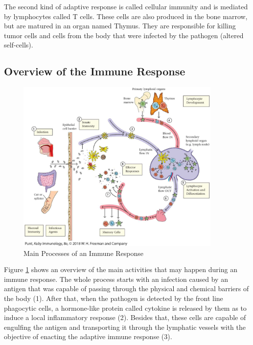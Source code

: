 The second kind of adaptive response is called cellular immunity and is mediated by lymphocytes called T cells. These cells are also produced in the bone marrow, but are matured in an organ named Thymus. They are responsible for killing tumor cells and cells from the body that were infected by the pathogen (altered self-cells).

\subsection{Overview of the Immune Response}

\begin{figure}[!h]
	\centering
	\includegraphics[width=0.9\textwidth, keepaspectratio]{img/overview_bis.png}
	\caption{Main Processes of an Immune Response~\cite{Kuby2019}}
	\label{fig:BISOverview}
\end{figure}

Figure \ref{fig:BISOverview} shows an overview of the main activities that may happen during an immune response. The whole process starts with an infection caused by an antigen that was capable of passing through the physical and chemical barriers of the body (1). After that, when the pathogen is detected by the front line phagocytic cells, a hormone-like protein called cytokine is released by them as to induce a local inflammatory response (2). Besides that, these cells are capable of engulfing the antigen and transporting it through the lymphatic vessels with the objective of enacting the adaptive immune response (3).

